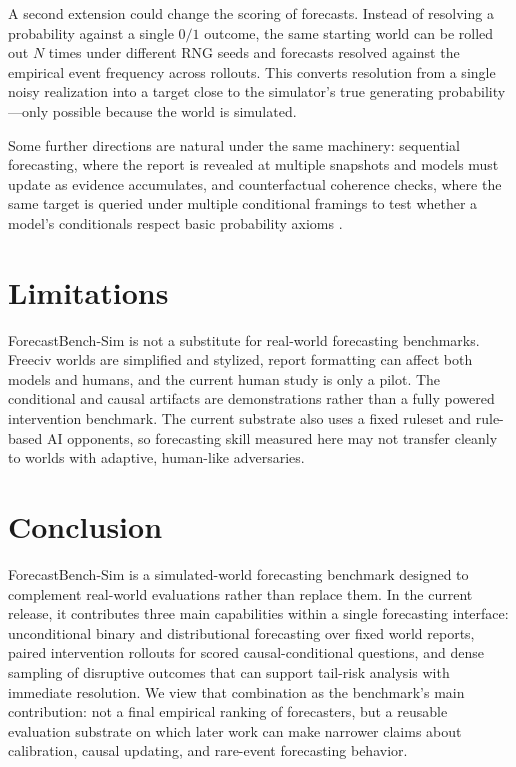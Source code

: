 \documentclass{article}
\begin{document}
A second extension could change the scoring of forecasts. Instead of resolving a probability against a single $0/1$ outcome, the same starting world can be rolled out $N$ times under different RNG seeds and forecasts resolved against the empirical event frequency across rollouts. This converts resolution from a single noisy realization into a target close to the simulator's true generating probability---only possible because the world is simulated.

Some further directions are natural under the same machinery: sequential forecasting, where the report is revealed at multiple snapshots and models must update as evidence accumulates, and counterfactual coherence checks, where the same target is queried under multiple conditional framings to test whether a model's conditionals respect basic probability axioms \citep{paleka2024consistency}.

\section{Limitations}

ForecastBench-Sim is not a substitute for real-world forecasting benchmarks. Freeciv worlds are simplified and stylized, report formatting can affect both models and humans, and the current human study is only a pilot. The conditional and causal artifacts are demonstrations rather than a fully powered intervention benchmark. The current substrate also uses a fixed ruleset and rule-based AI opponents, so forecasting skill measured here may not transfer cleanly to worlds with adaptive, human-like adversaries.

\section{Conclusion}

ForecastBench-Sim is a simulated-world forecasting benchmark designed to complement real-world evaluations rather than replace them. In the current release, it contributes three main capabilities within a single forecasting interface: unconditional binary and distributional forecasting over fixed world reports, paired intervention rollouts for scored causal-conditional questions, and dense sampling of disruptive outcomes that can support tail-risk analysis with immediate resolution. We view that combination as the benchmark's main contribution: not a final empirical ranking of forecasters, but a reusable evaluation substrate on which later work can make narrower claims about calibration, causal updating, and rare-event forecasting behavior.
\end{document}
